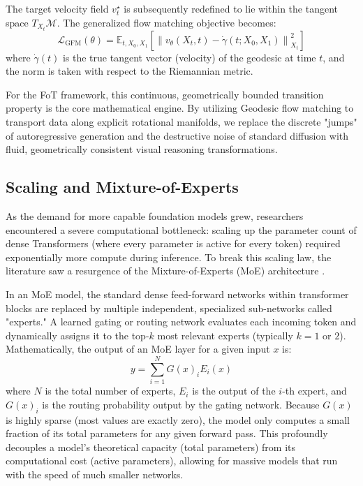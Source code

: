 \documentclass{l4proj}
\begin{document}
The target velocity field $v^\star_t$ is subsequently redefined to lie within the tangent space $T_{X_t}\mathcal{M}$. The generalized flow matching objective becomes:
\begin{equation}
    \mathcal{L}_{\text{GFM}}(\theta) = \mathbb{E}_{t, X_0, X_1}\left[ \left\lVert v_\theta(X_t, t) - \dot{\gamma}(t; X_0, X_1) \right\rVert_{X_t}^2 \right]
\end{equation}
where $\dot{\gamma}(t)$ is the true tangent vector (velocity) of the geodesic at time $t$, and the norm is taken with respect to the Riemannian metric.

For the FoT framework, this continuous, geometrically bounded transition property is the core mathematical engine. By utilizing Geodesic flow matching to transport data along explicit rotational manifolds, we replace the discrete "jumps" of autoregressive generation and the destructive noise of standard diffusion with fluid, geometrically consistent visual reasoning transformations.


\subsection{Scaling and Mixture-of-Experts}
As the demand for more capable foundation models grew, researchers encountered a severe computational bottleneck: scaling up the parameter count of dense Transformers (where every parameter is active for every token) required exponentially more compute during inference. To break this scaling law, the literature saw a resurgence of the Mixture-of-Experts (MoE) architecture \citep{shazeer2017outrageously, fedus2022switch}.

In an MoE model, the standard dense feed-forward networks within transformer blocks are replaced by multiple independent, specialized sub-networks called "experts." A learned gating or routing network evaluates each incoming token and dynamically assigns it to the top-$k$ most relevant experts (typically $k=1$ or $2$). Mathematically, the output of an MoE layer for a given input $x$ is:
\begin{equation}
    y = \sum_{i=1}^{N} G(x)_i E_i(x)
\end{equation}
where $N$ is the total number of experts, $E_i$ is the output of the $i$-th expert, and $G(x)_i$ is the routing probability output by the gating network. Because $G(x)$ is highly sparse (most values are exactly zero), the model only computes a small fraction of its total parameters for any given forward pass. This profoundly decouples a model's theoretical capacity (total parameters) from its computational cost (active parameters), allowing for massive models that run with the speed of much smaller networks.
\end{document}
